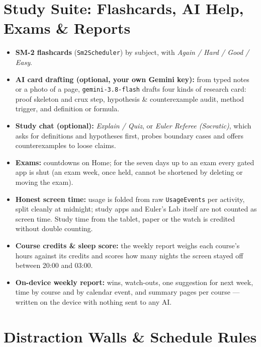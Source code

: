 \documentclass[11pt,a4paper]{article}
\begin{document}
\section{Study Suite: Flashcards, AI Help, Exams \& Reports}
\begin{itemize}
  \item \textbf{SM-2 flashcards} (\texttt{Sm2Scheduler}) by subject, with \emph{Again / Hard / Good / Easy}.
  \item \textbf{AI card drafting (optional, your own Gemini key):} from typed notes or a photo of a page, \texttt{gemini-3.8-flash} drafts four kinds of research card: proof skeleton and crux step, hypothesis \& counterexample audit, method trigger, and definition or formula.
  \item \textbf{Study chat (optional):} \emph{Explain / Quiz}, or \emph{Euler Referee (Socratic)}, which asks for definitions and hypotheses first, probes boundary cases and offers counterexamples to loose claims.
  \item \textbf{Exams:} countdowns on Home; for the seven days up to an exam every gated app is shut (an exam week, once held, cannot be shortened by deleting or moving the exam).
  \item \textbf{Honest screen time:} usage is folded from raw \texttt{UsageEvents} per activity, split cleanly at midnight; study apps and Euler's Lab itself are not counted as screen time. Study time from the tablet, paper or the watch is credited without double counting.
  \item \textbf{Course credits \& sleep score:} the weekly report weighs each course's hours against its credits and scores how many nights the screen stayed off between 20:00 and 03:00.
  \item \textbf{On-device weekly report:} wins, watch-outs, one suggestion for next week, time by course and by calendar event, and summary pages per course --- written on the device with nothing sent to any AI.
\end{itemize}

\section{Distraction Walls \& Schedule Rules}
\end{document}
